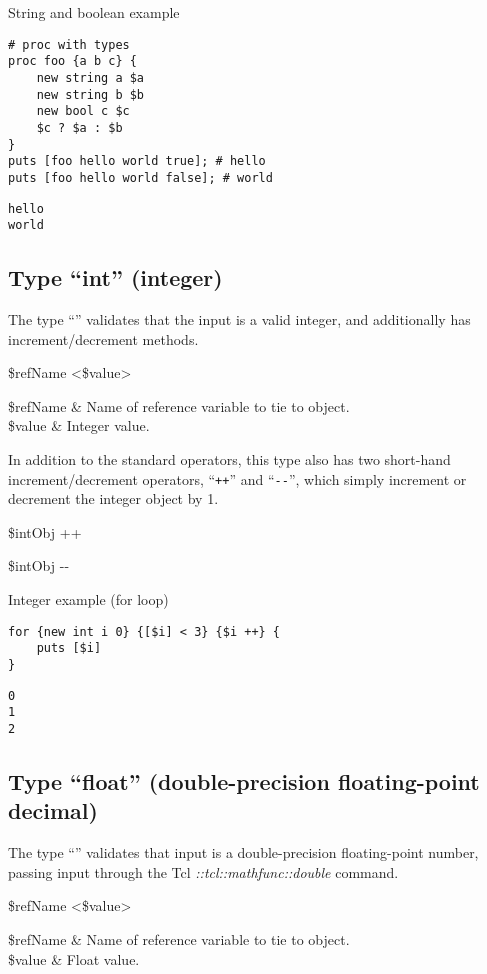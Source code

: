 \documentclass{article}
\begin{document}
\begin{example}{String and boolean example}
\begin{lstlisting}
# proc with types
proc foo {a b c} {
    new string a $a
    new string b $b
    new bool c $c
    $c ? $a : $b
}
puts [foo hello world true]; # hello
puts [foo hello world false]; # world
\end{lstlisting}
\tcblower
\begin{lstlisting}
hello
world
\end{lstlisting}
\end{example}
\clearpage
\subsection{Type ``int'' (integer)}
The type ``'' validates that the input is a valid integer, and additionally has increment/decrement methods.
\begin{syntax}
 \$refName <\$value>
\end{syntax}
\begin{args}
\$refName & Name of reference variable to tie to object. \\
\$value & Integer value.
\end{args}
In addition to the standard operators, this type also has two short-hand increment/decrement operators, ``\texttt{++}'' and ``\texttt{-{}-}'', which simply increment or decrement the integer object by 1.
\begin{syntax}
\$intObj ++ 
\end{syntax}
\begin{syntax}
\$intObj -{}-
\end{syntax}

\begin{example}{Integer example (for loop)}
\begin{lstlisting}
for {new int i 0} {[$i] < 3} {$i ++} {
    puts [$i]
}
\end{lstlisting}
\tcblower
\begin{lstlisting}
0
1
2
\end{lstlisting}
\end{example}
\clearpage

\subsection{Type ``float'' (double-precision floating-point decimal)}
The type ``'' validates that input is a double-precision floating-point number, passing input through the Tcl \textit{::tcl::mathfunc::double} command.
\begin{syntax}
 \$refName <\$value>
\end{syntax}
\begin{args}
\$refName & Name of reference variable to tie to object. \\
\$value & Float value.
\end{args}
\end{document}
